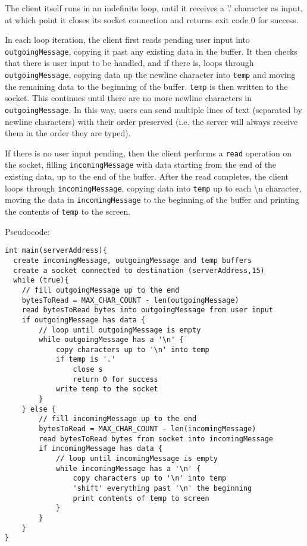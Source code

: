 \documentclass[]{article}
\begin{document}
The client itself runs in an indefinite loop, until it receives a '.' character as input, at which point it closes its socket connection and returns exit code 0 for success. 

In each loop iteration, the client first reads pending user input into \\ \texttt{outgoingMessage}, copying it past any existing data in the buffer. It then checks that there is user input to be handled, and if there is, loops through \texttt{outgoingMessage}, copying data up the newline character into \texttt{temp} and moving the remaining data to the beginning of the buffer. \texttt{temp} is then written to the socket. This continues until there are no more newline characters in \texttt{outgoingMessage}. In this way, users can send multiple lines of text (separated by newline characters) with their order preserved (i.e. the server will always receive them in the order they are typed).

If there is no user input pending, then the client performs a \texttt{read} operation on the socket, filling \texttt{incomingMessage} with data starting from the end of the existing data, up to the end of the buffer. After the read completes, the client loops through \texttt{incomingMessage}, copying data into \texttt{temp} up to each \textbackslash n character, moving the data in \texttt{incomingMessage} to the beginning of the buffer and printing the contents of \texttt{temp} to the screen. \\

\pagebreak

\noindent Pseudocode:

\begin{lstlisting}
int main(serverAddress){
  create incomingMessage, outgoingMessage and temp buffers
  create a socket connected to destination (serverAddress,15)
  while (true){
    // fill outgoingMessage up to the end
    bytesToRead = MAX_CHAR_COUNT - len(outgoingMessage)
	read bytesToRead bytes into outgoingMessage from user input
	if outgoingMessage has data {
		// loop until outgoingMessage is empty
		while outgoingMessage has a '\n' {
			copy characters up to '\n' into temp
			if temp is '.'
				close s
				return 0 for success
			write temp to the socket
		}
	} else {
		// fill incomingMessage up to the end
		bytesToRead = MAX_CHAR_COUNT - len(incomingMessage)
		read bytesToRead bytes from socket into incomingMessage
		if incomingMessage has data {
			// loop until incomingMessage is empty
			while incomingMessage has a '\n' {
				copy characters up to '\n' into temp
				'shift' everything past '\n' the beginning
				print contents of temp to screen
			}
		}
	}	
}
\end{lstlisting}
\end{document}
